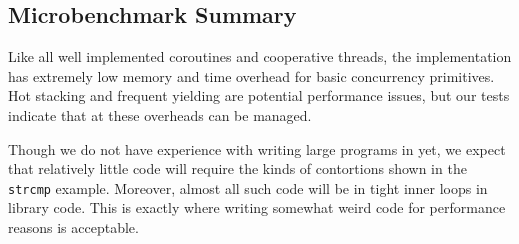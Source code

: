 \documentclass[a4paper,UKenglish,cleveref, autoref]{lipics-v2019}
\begin{document}
\subsection{Microbenchmark Summary}

Like all well implemented coroutines and cooperative threads, the \charcoal{} implementation has extremely low memory and time overhead for basic concurrency primitives.
Hot stacking and frequent yielding are potential performance issues, but our tests indicate that at these overheads can be managed.

Though we do not have experience with writing large programs in \charcoal{} yet, we expect that relatively little code will require the kinds of contortions shown in the \texttt{strcmp} example.
Moreover, almost all such code will be in tight inner loops in library code.
This is exactly where writing somewhat weird code for performance reasons is acceptable.




\end{document}

